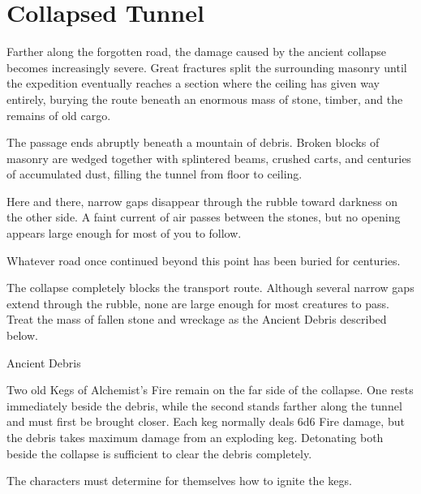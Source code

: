 \section*{ Collapsed Tunnel}
{\entryfont Farther along the forgotten road, the damage caused by the ancient collapse becomes increasingly severe. Great fractures split the surrounding masonry until the expedition eventually reaches a section where the ceiling has given way entirely, burying the route beneath an enormous mass of stone, timber, and the remains of old cargo.}
\begin{DndReadAloud}
	The passage ends abruptly beneath a mountain of debris. Broken blocks of masonry are wedged together with splintered beams, crushed carts, and centuries of accumulated dust, filling the tunnel from floor to ceiling.

	Here and there, narrow gaps disappear through the rubble toward darkness on the other side. A faint current of air passes between the stones, but no opening appears large enough for most of you to follow.

	Whatever road once continued beyond this point has been buried for centuries.
\end{DndReadAloud}
{\noindent\entryfont The collapse completely blocks the transport route. Although several narrow gaps extend through the rubble, none are large enough for most creatures to pass. Treat the mass of fallen stone and wreckage as the Ancient Debris described below.}
\begin{DndObject}[width=0.5\textwidth]{Ancient Debris}
	\DndObjectBasics[
		armor-class			= {10},
		hit-points			= {140},
		damage-threshold	= {10},
		damage-vulnerabilities	= {Fire, Force},
		damage-immunities		= {Necrotic, Piercing, Poison, Psychic, Radiant, Slashing},
	]
\end{DndObject}
{\noindent\entryfont Two old Kegs of Alchemist's Fire remain on the far side of the collapse. One rests immediately beside the debris, while the second stands farther along the tunnel and must first be brought closer. Each keg normally deals 6d6 Fire damage, but the debris takes maximum damage from an exploding keg. Detonating both beside the collapse is sufficient to clear the debris completely.

The characters must determine for themselves how to ignite the kegs.}


